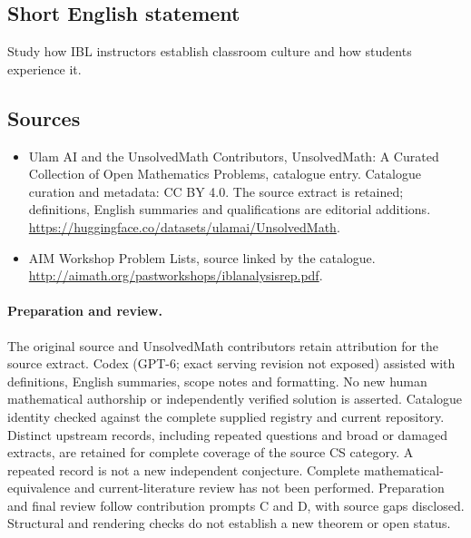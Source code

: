 \documentclass[11pt]{article}
\begin{document}
\subsection{Short English statement}
Study how IBL instructors establish classroom culture and how students experience it.
\subsection{Sources}
\begin{itemize}
\item[\hypertarget{source:statement:1}{S1}] Ulam AI and the UnsolvedMath Contributors, UnsolvedMath: A Curated Collection of Open Mathematics Problems, catalogue entry. Catalogue curation and metadata: CC BY 4.0. The source extract is retained; definitions, English summaries and qualifications are editorial additions.
\url{https://huggingface.co/datasets/ulamai/UnsolvedMath}.
\item[\hypertarget{source:statement:2}{S2}] AIM Workshop Problem Lists, source linked by the catalogue.
\url{http://aimath.org/pastworkshops/iblanalysisrep.pdf}.
\end{itemize}
\paragraph{Preparation and review.}
The original source and UnsolvedMath contributors retain attribution for the source extract. Codex (GPT-6; exact serving revision not exposed) assisted with definitions, English summaries, scope notes and formatting. No new human mathematical authorship or independently verified solution is asserted. Catalogue identity checked against the complete supplied registry and current repository. Distinct upstream records, including repeated questions and broad or damaged extracts, are retained for complete coverage of the source CS category. A repeated record is not a new independent conjecture. Complete mathematical-equivalence and current-literature review has not been performed. Preparation and final review follow contribution prompts C and D, with source gaps disclosed. Structural and rendering checks do not establish a new theorem or open status.
\label{end:statement}
\end{document}

